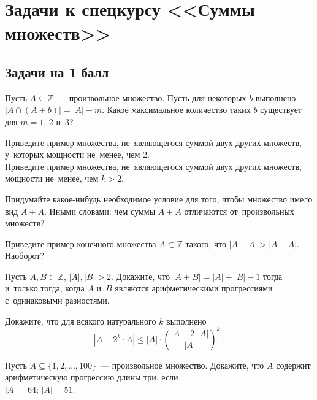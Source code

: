 
\section*{Задачи к спецкурсу <<Суммы множеств>>}



\subsection*{Задачи на 1 балл}

\begin{problems}

\item
Пусть $A \subseteq \mathbb{Z}$~--- произвольное множество.
Пусть для некоторых $b$ выполнено
\(
    |A \cap (A + b)| = |A| - m
\).
Какое максимальное количество таких $b$ существует для $m = 1$, $2$ и~$3$?

\item
\subproblem
Приведите пример множества, не~являющегося суммой двух других множеств,
у~которых мощности не~менее, чем 2.
\\
\subproblem
Приведите пример множества, не~являющегося суммой двух других множеств,
мощности не~менее, чем $k>2$.

\item
Придумайте какое-нибудь необходимое условие для того, чтобы множество имело
вид $A + A$.
Иными словами: чем суммы $A + A$ отличаются от~произвольных множеств?

\item
Приведите пример конечного множества $A \subset \mathbb{Z}$ такого, что
$|A + A| > |A - A|$.
Наоборот?

\item
Пусть $A, B \subset \mathbb{Z}$, $|A|, |B| > 2$.
Докажите, что $|A + B| = |A| + |B| - 1$ тогда и~только тогда, когда $A$ и~$B$
являются арифметическими прогрессиями с~одинаковыми разностями.

\item
Докажите, что для всякого натурального $k$ выполнено
\[
    |A - 2^{k} \cdot A|
\leq
    |A| \cdot
    \left(
        \frac{|A - 2 \cdot A|}{|A|}
    \right)^k
\;.\]

\item
Пусть $A \subseteq \{ 1,2, \ldots, 100 \}$~--- произвольное множество.
Докажите, что $A$ содержит арифметическую прогрессию длины три, если
\\
\subproblem $|A| = 64$;
\quad
\subproblem $|A| = 51$.


\end{problems}
